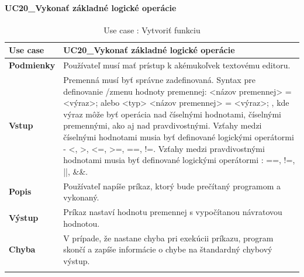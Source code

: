\paragraph{UC20\_Vykonať základné logické operácie}
\begin{center}
	\begin{longtable}{|p{2.5cm}|p{12.2cm}|}
		
			\hline
			\textbf{Use case} & UC20\_Vykonať základné logické operácie\\ 
			\hline
			\textbf{Podmienky} & Používateľ musí mať prístup k akémukoľvek textovému editoru.  \\ 
			\hline
			\textbf{Vstup} & Premenná musí byť správne zadefinovaná. \newline
			Syntax pre definovanie /zmenu hodnoty premennej:  \newline
			<názov premennej> = <výraz>; alebo \newline
			<typ> <názov premennej> = <výraz>;
			\newline
			, kde výraz môže byť operácia nad číselnými hodnotami, číselnými premennými, ako aj nad pravdivostnými.\newline
			Vzťahy medzi číselnými hodnotami musia byť definované logickými operátormi - <, >, <=, >=, ==, !=.\newline
			Vzťahy medzi pravdivostnými hodnotami musia byť definované logickými operátormi : ==, !=, ||, \&\&.  \\
			\hline
			\textbf{Popis} & Používateľ napíše príkaz, ktorý bude prečítaný programom a vykonaný.\\ 
			\hline
			\textbf{Výstup} & Príkaz nastaví hodnotu premennej s vypočítanou návratovou hodnotou.\\
			\hline
			\textbf{Chyba} & V prípade, že nastane chyba pri exekúcii príkazu, program skončí a zapíše informácie o chybe na štandardný chybový výstup.\\
			\hline
		\caption{Use case : Vytvoriť funkciu}
		\label{table:1}
		
	\end{longtable}
\end{center}

